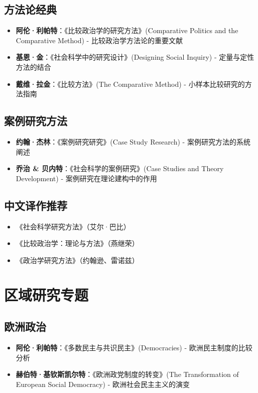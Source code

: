 \subsection{方法论经典}
\begin{itemize}
    \item \textbf{阿伦·利帕特}：《比较政治学的研究方法》(Comparative Politics and the Comparative Method)
    \quad - 比较政治学方法论的重要文献
    \item \textbf{基恩·金}：《社会科学中的研究设计》(Designing Social Inquiry)
    \quad - 定量与定性方法的结合
    \item \textbf{戴维·拉金}：《比较方法》(The Comparative Method)
    \quad - 小样本比较研究的方法指南
\end{itemize}

\subsection{案例研究方法}
\begin{itemize}
    \item \textbf{约翰·杰林}：《案例研究研究》(Case Study Research)
    \quad - 案例研究方法的系统阐述
    \item \textbf{乔治 \& 贝内特}：《社会科学的案例研究》(Case Studies and Theory Development)
    \quad - 案例研究在理论建构中的作用
\end{itemize}

\subsection{中文译作推荐}
\begin{itemize}
    \item 《社会科学研究方法》（艾尔·巴比）
    \item 《比较政治学：理论与方法》（燕继荣）
    \item 《政治学研究方法》（约翰逊、雷诺兹）
\end{itemize}

\section{区域研究专题}

\subsection{欧洲政治}
\begin{itemize}
    \item \textbf{阿伦·利帕特}：《多数民主与共识民主》(Democracies)
    \quad - 欧洲民主制度的比较分析
    \item \textbf{赫伯特·基钦斯凯尔特}：《欧洲政党制度的转变》(The Transformation of European Social Democracy)
    \quad - 欧洲社会民主主义的演变
\end{itemize}

